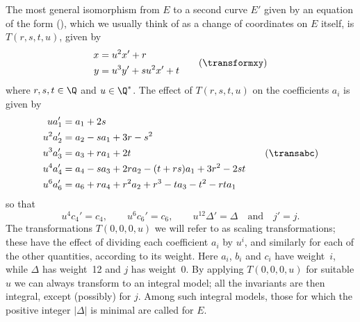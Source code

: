 The most general isomorphism from $E$ to a second curve $E'$ given by an 
equation of the form (\curveeq), which we usually think of as a change of 
coordinates on $E$ itself, is $T(r,s,t,u)$, given by \neweq{\transformxy}
$$
    \aligned
                x &= u^2x' + r          \\
                y &= u^3y' + su^2x' + t \\        
    \endaligned                         \tag\transformxy 
$$
where $r,s,t\in\Q$ and $u\in\Q^*$.  The effect of $T(r,s,t,u)$ on the
coefficients $a_i$ is given by \neweq{\transabc}
$$
  \aligned
        u  a_1' &= a_1+2s                               \\
        u^2a_2' &= a_2-sa_1+3r-s^2                      \\
        u^3a_3' &= a_3+ra_1+2t                          \\
        u^4a_4' &= a_4-sa_3+2ra_2-(t+rs)a_1+3r^2-2st    \\
        u^6a_6' &= a_6+ra_4+r^2a_2+r^3-ta_3-t^2-rta_1   \\
  \endaligned                                            \tag\transabc  
$$ 
so that 
$$ 
   u^4c_4' = c_4, \qquad 
   u^6c_6' = c_6, \qquad 
   u^{12}\Delta' = \Delta \quad\text{and}\quad 
   j' = j.  
$$ 
The transformations $T(0,0,0,u)$ we will refer to as scaling
transformations; these have the effect of dividing each coefficient
$a_i$ by $u^i$, and similarly for each of the other quantities,
according to its weight.  Here $a_i$, $b_i$ and $c_i$ have weight~$i$,
while $\Delta$ has weight~12 and $j$ has weight~0.  By applying
$T(0,0,0,u)$ for suitable $u$ we can always transform to an integral
model; all the invariants are then integral, except (possibly) for
$j$.  Among such integral models, those for which the positive integer
$|\Delta|$ is minimal are called  for $E$.
